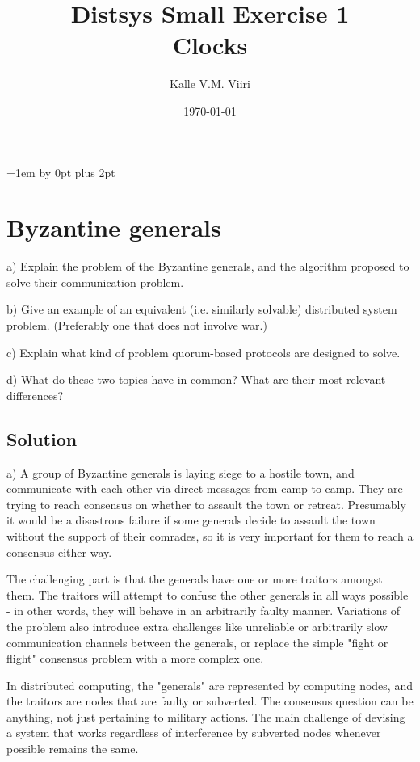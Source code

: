 \documentclass[12pt,a4paper,titlepage]{article}
\title{Distsys Small Exercise 1 \\ Clocks \vspace{0.5em}}
\author{Kalle V.M. Viiri}
\date{\today}
\begin{document}
\setcounter{page}{1}
\parskip=1em \advance\parskip by 0pt plus 2pt

\maketitle

\section{Byzantine generals}

a) Explain the problem of the Byzantine generals, and the algorithm proposed to solve their communication problem.

b) Give an example of an equivalent (i.e. similarly solvable) distributed system problem. (Preferably one that does not involve war.)

c) Explain what kind of problem quorum-based protocols are designed to solve.

d) What do these two topics have in common? What are their most relevant differences?

\subsection{Solution}

a) A group of Byzantine generals is laying siege to a hostile town, and communicate with each other via direct messages from camp to camp. They are trying to reach consensus on whether to assault the town or retreat. Presumably it would be a disastrous failure if some generals decide to assault the town without the support of their comrades, so it is very important for them to reach a consensus either way.

The challenging part is that the generals have one or more traitors amongst them. The traitors will attempt to confuse the other generals in all ways possible - in other words, they will behave in an arbitrarily faulty manner. Variations of the problem also introduce extra challenges like unreliable or arbitrarily slow communication channels between the generals, or replace the simple "fight or flight" consensus problem with a more complex one.

In distributed computing, the "generals" are represented by computing nodes, and the traitors are nodes that are faulty or subverted. The consensus question can be anything, not just pertaining to military actions. The main challenge of devising a system that works regardless of interference by subverted nodes whenever possible remains the same.
\end{document}
